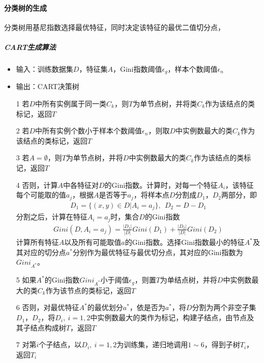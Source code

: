 \paragraph{分类树的生成}

分类树用基尼指数选择最优特征，同时决定该特征的最优二值切分点，
\subparagraph{CART生成算法}
\begin{itemize}
\item 输入：训练数据集$D$，特征集$A$，Gini指数阈值$\epsilon_g$，样本个数阈值$\epsilon_n$
\item 输出：CART决策树
\item[1] 若$D$中所有实例属于同一类$C_k$，则$T$为单节点树，并将类$C_k$作为该结点的类标记，返回$T$
\item[2] 若$D$中所有实例个数小于样本个数阈值$\epsilon_n$，则取$D$中实例数最大的类$C_k$作为该结点的类标记，返回$T$
\item[3] 若$A=\emptyset$，则$T$为单节点树，并将$D$中实例数最大的类$C_k$作为该结点的类标记，返回$T$
\item[4] 否则，计算$A$中各特征对$D$的Gini指数。计算时，对每一个特征$A_i$，该特征每个可能取的值$a_j$，根据$A$是否等于$a_j$，将样本点$D$分割成$D_1$，$D_2$两部分，即
\begin{eqnarray}
D_1=\{ (x,y)\in D|A_i=a_j \},\ \ D_2 = D-D_1
\end{eqnarray}
分割之后，计算在特征$A_i=a_j$时，集合$D$的Gini指数
\begin{eqnarray}
Gini(D,A_i=a_j)=\frac{|D_1|}{|D|}Gini(D_1)+\frac{|D_2|}{|D|}Gini(D_2)
\end{eqnarray}
计算所有特征$A$以及所有可能取值$a$的Gini指数。选择Gini指数最小的特征$A^*$及其对应的切分点$a^*$分别作为最优特征与最优切分点，其对应的Gini指数为$Gini_{A^*}$。
\item[5] 如果$A^*$的Gini指数$Gini_{A^*}$小于阈值$\epsilon_g$，则置$T$为单结点树，并将$D$中实例数最大的类$C_k$作为该节点的类标记，返回$T$
\item[6] 否则，对最优特征$A^*$的最优划分$a^*$，依是否为$a^*$，将$D$分割为两个非空子集$D_1$，$D_2$，将$D_i,\ i=1,2$中实例数最大的类作为标记，构建子结点，由节点及其子结点构成树$T$，返回$T$
\item[7] 对第$i$个子结点，以$D_i,\ i=1,2$为训练集，递归地调用$1\sim 6$，得到子树$T_i$，返回$T_i$
\end{itemize}